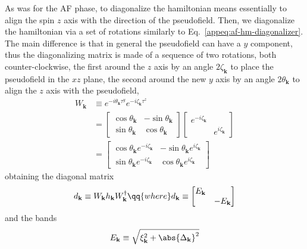 As was for the AF phase, to diagonalize the hamiltonian means essentially to align the spin $z$ axis with the direction of the pseudofield. Then, we diagonalize the hamiltonian via a set of rotations similarly to Eq.~\eqref{appeq:af-hm-diagonalizer}. The main difference is that in general the pseudofield can have a $y$ component, thus the diagonalizing matrix is made of a sequence of two rotations, both counter-clockwise, the first around the $z$ axis by an angle $2\zeta_\mathbf{k}$ to place the pseudofield in the $xz$ plane, the second around the new $y$ axis by an angle $2\theta_\mathbf{k}$ to align the $z$ axis with the pseudofield,
\begin{align}
	W_\mathbf{k} &\equiv e^{-i \theta_\mathbf{k} \tau^y} e^{-i \zeta_\mathbf{k} \tau^z} \nonumber \\
	&= \begin{bmatrix}
		\cos \theta_\mathbf{k} & - \sin \theta_\mathbf{k} \\
		\sin \theta_\mathbf{k} & \cos \theta_\mathbf{k}
	\end{bmatrix} \begin{bmatrix}
		e^{-i\zeta_\mathbf{k}} & \\ 
		& e^{i\zeta_\mathbf{k}}
	\end{bmatrix} \nonumber \\
	&= \begin{bmatrix}
		\cos \theta_\mathbf{k} e^{-i\zeta_\mathbf{k}} & - \sin \theta_\mathbf{k} e^{i\zeta_\mathbf{k}} \\
		\sin \theta_\mathbf{k} e^{-i\zeta_\mathbf{k}} & \cos \theta_\mathbf{k} e^{i\zeta_\mathbf{k}}
	\end{bmatrix} \label{appeq:sc-hm-diagonalizer}
\end{align}
obtaining the diagonal matrix
\[
	d_\mathbf{k} \equiv W_\mathbf{k} h_\mathbf{k} W_\mathbf{k}^\dagger 
	\qq{where}
	d_\mathbf{k} \equiv \begin{bmatrix}
		E_\mathbf{k} & \\ & -E_\mathbf{k}
	\end{bmatrix}
\]
and the bands
\[
	E_\mathbf{k} \equiv \sqrt{\xi_\mathbf{k}^2 + \abs{\Delta_\mathbf{k}}^2}
\]


